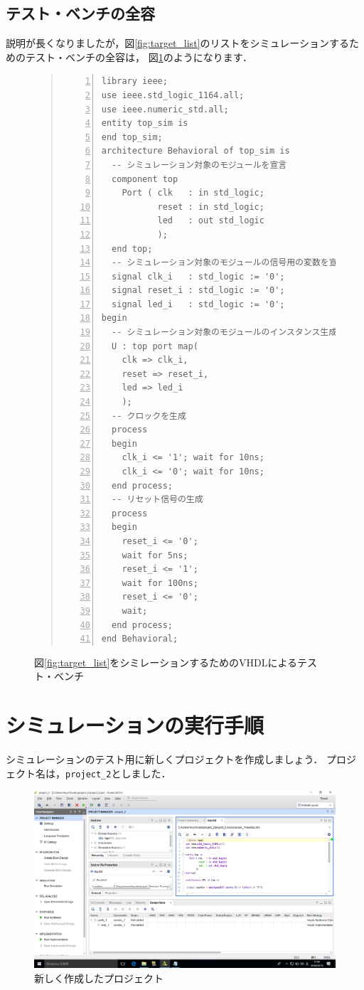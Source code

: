 \documentclass[a4paper,dvipdfmx]{jsarticle}
\begin{document}
\subsection{テスト・ベンチの全容}

説明が長くなりましたが，図\ref{fig:target_list}のリストをシミュレーションするためのテスト・ベンチの全容は，
図\ref{fig:simulation_list}のようになります．

\begin{figure}[H]
\begin{quote}
\begin{Verbatim}[frame=single, numbers=left, baselinestretch=0.8]
library ieee;
use ieee.std_logic_1164.all;
use ieee.numeric_std.all;
entity top_sim is
end top_sim;
architecture Behavioral of top_sim is
  -- シミュレーション対象のモジュールを宣言
  component top
    Port ( clk   : in std_logic;
           reset : in std_logic;
           led   : out std_logic
           );
  end top;
  -- シミュレーション対象のモジュールの信号用の変数を宣言
  signal clk_i   : std_logic := '0';
  signal reset_i : std_logic := '0';
  signal led_i   : std_logic := '0';
begin
  -- シミュレーション対象のモジュールのインスタンス生成
  U : top port map(
    clk => clk_i,
    reset => reset_i,
    led => led_i
    );
  -- クロックを生成
  process
  begin
    clk_i <= '1'; wait for 10ns;
    clk_i <= '0'; wait for 10ns;
  end process;
  -- リセット信号の生成
  process
  begin
    reset_i <= '0';
    wait for 5ns;
    reset_i <= '1';
    wait for 100ns;
    reset_i <= '0';
    wait;
  end process;
end Behavioral;
\end{Verbatim}
\end{quote}
\caption{図\ref{fig:target_list}をシミレーションするためのVHDLによるテスト・ベンチ\label{fig:simulation_list}}
\end{figure}

\section{シミュレーションの実行手順}

シミュレーションのテスト用に新しくプロジェクトを作成しましょう．
プロジェクト名は，\verb|project_2|としました．

 \begin{figure}[H]
  \begin{center}
   \includegraphics[width=.8\textwidth]{chapter04_figures/VirtualBox_Windows10_19_03_2018_11_59_40.png}
  \end{center}
  \caption{新しく作成したプロジェクト}
 \end{figure}
\end{document}
